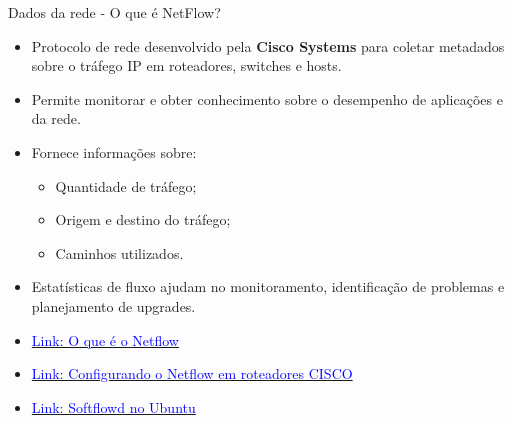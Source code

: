 \begin{frame}{Dados da rede - O que é NetFlow?}
    \begin{itemize}
        \item Protocolo de rede desenvolvido pela \textbf{Cisco Systems} para coletar metadados sobre o tráfego IP em roteadores, switches e hosts.
        \item Permite monitorar e obter conhecimento sobre o desempenho de aplicações e da rede.
        \item Fornece informações sobre:
              \begin{itemize}
                  \item Quantidade de tráfego;
                  \item Origem e destino do tráfego;
                  \item Caminhos utilizados.
              \end{itemize}
        \item Estatísticas de fluxo ajudam no monitoramento, identificação de problemas e planejamento de upgrades.
    \end{itemize}

    \begin{itemize}
        \item \href{https://www.ibm.com/br-pt/think/topics/netflow}{\textcolor{blue}{Link: O que é o Netflow}}
        \item \href{https://www.ibm.com/docs/pt-br/npi/1.3.0?topic=devices-configuring-netflow-cisco-routers}{\textcolor{blue}{Link: Configurando o Netflow em roteadores CISCO}}
        \item \href{https://manpages.ubuntu.com/manpages/noble/man8/softflowd.8.html}{\textcolor{blue}{Link: Softflowd no Ubuntu}}
    \end{itemize}
\end{frame}

